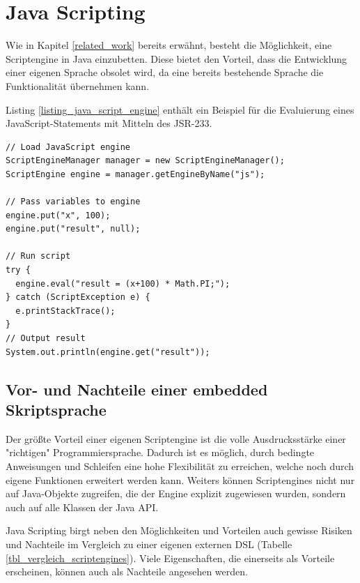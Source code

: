\section{Java Scripting}
\label{section_java_scripting}

Wie in Kapitel \ref{related_work} bereits erwähnt, besteht die Möglichkeit, eine Scriptengine in Java einzubetten. Diese bietet den Vorteil, dass die Entwicklung einer eigenen Sprache obsolet wird, da eine bereits bestehende Sprache die Funktionalität übernehmen kann.

Listing \ref{listing_java_script_engine} enthält ein Beispiel für die Evaluierung eines Java\-Script-Sta\-te\-ments mit Mitteln des JSR-233. \\



\begin{lstlisting}[caption={Descriptive Caption Text},label=listing_java_script_engine]
// Load JavaScript engine
ScriptEngineManager manager = new ScriptEngineManager();
ScriptEngine engine = manager.getEngineByName("js");

// Pass variables to engine
engine.put("x", 100);
engine.put("result", null);

// Run script
try {
  engine.eval("result = (x+100) * Math.PI;");
} catch (ScriptException e) {
  e.printStackTrace();
}
// Output result
System.out.println(engine.get("result"));
\end{lstlisting}

\subsection{Vor- und Nachteile einer embedded Skriptsprache}

Der größte Vorteil einer eigenen Scriptengine ist die volle Ausdrucksstärke einer "richtigen" Programmiersprache. Dadurch ist es möglich, durch bedingte Anweisungen und Schleifen eine hohe Flexibilität zu erreichen, welche noch durch eigene Funktionen erweitert werden kann. Weiters können Script\-en\-gi\-nes nicht nur auf Java-Objekte zugreifen, die der Engine explizit zu\-ge\-wie\-sen wurden, sondern auch auf alle Klassen der Java API. 

Java Scripting birgt neben den Möglichkeiten und Vorteilen auch gewisse Risiken und Nachteile im Vergleich zu einer eigenen externen DSL (Tabelle \ref{tbl_vergleich_scriptengines}). Viele Eigenschaften, die einerseits als Vorteile erscheinen, können auch als Nachteile angesehen werden. 

